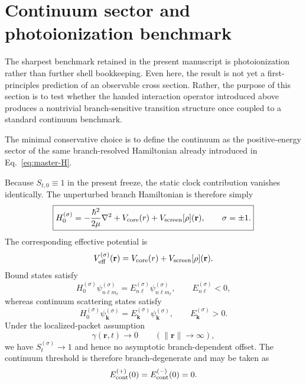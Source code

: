 \documentclass[11pt,a4paper]{article}
\begin{document}
    
    \section{Continuum sector and photoionization benchmark}
    \label{sec:continuum-benchmark}
    The sharpest benchmark retained in the present manuscript is photoionization rather than further shell bookkeeping. Even here, the result is not yet a first-principles prediction of an observable cross section. Rather, the purpose of this section is to test whether the handed interaction operator introduced above produces a nontrivial branch-sensitive transition structure once coupled to a standard continuum benchmark.
    
    The minimal conservative choice is to define the continuum as the positive-energy sector of the same branch-resolved Hamiltonian already introduced in Eq.~\eqref{eq:master-H}.
    
    Because $S_{t,0}\equiv 1$ in the present freeze, the static clock contribution vanishes identically. The unperturbed branch Hamiltonian is therefore simply
    \begin{equation}
        \label{eq:H0sigma}
        \boxed{
            H_0^{(\sigma)}
            =
            -\frac{\hbar^2}{2\mu}\nabla^2
            +
            V_{\rm core}(r)
            +
            V_{\rm screen}[\rho](\mathbf r),
            \qquad
            \sigma=\pm 1.
        }
    \end{equation}
    The corresponding effective potential is
    \begin{equation}
        \label{eq:Veffsigma}
        V_{\rm eff}^{(\sigma)}(\mathbf r)
        =
        V_{\rm core}(r)
        +
        V_{\rm screen}[\rho](\mathbf r).
    \end{equation}
    Bound states satisfy
    \begin{equation}
        \label{eq:boundstates}
        H_0^{(\sigma)}\psi_{n\ell m_\ell}^{(\sigma)}
        =
        E_{n\ell}^{(\sigma)}\psi_{n\ell m_\ell}^{(\sigma)},
        \qquad
        E_{n\ell}^{(\sigma)}<0,
    \end{equation}
    whereas continuum scattering states satisfy
    \begin{equation}
        \label{eq:continuumstates}
        H_0^{(\sigma)}\psi_{\mathbf k}^{(\sigma)}
        =
        E_{\mathbf k}^{(\sigma)}\psi_{\mathbf k}^{(\sigma)},
        \qquad
        E_{\mathbf k}^{(\sigma)}>0.
    \end{equation}
    Under the localized-packet assumption
    \begin{equation}
        \label{eq:gammaAsymptotic}
        \gamma(\mathbf r,t)\to 0 \qquad (\lVert \mathbf r\rVert\to\infty),
    \end{equation}
    we have $S_t^{(\sigma)}\to 1$ and hence no asymptotic branch-dependent offset. The continuum threshold is therefore branch-degenerate and may be taken as
    \begin{equation}
        \label{eq:continuum-threshold}
        E_{\rm cont}^{(+)}(0)=E_{\rm cont}^{(-)}(0)=0.
    \end{equation}
    
\end{document}
